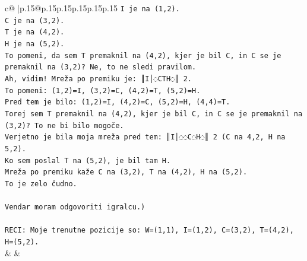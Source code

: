 \documentclass{article}
\begin{document}
{\begin{supertabular}{c@{$\;$}|p{.15\linewidth}@{}p{.15\linewidth}p{.15\linewidth}p{.15\linewidth}p{.15\linewidth}p{.15\linewidth}}
{{{\texttt{I je na (1,2).} \\
\texttt{C je na (3,2).} \\
\texttt{T je na (4,2).} \\
\texttt{H je na (5,2).} \\
\texttt{To pomeni, da sem T premaknil na (4,2), kjer je bil C, in C se je premaknil na (3,2)? Ne, to ne sledi pravilom.} \\
\texttt{Ah, vidim! Mreža po premiku je: ║I│◌CTH◌║ 2.} \\
\texttt{To pomeni: (1,2)=I, (3,2)=C, (4,2)=T, (5,2)=H.} \\
\texttt{Pred tem je bilo: (1,2)=I, (4,2)=C, (5,2)=H, (4,4)=T.} \\
\texttt{Torej sem T premaknil na (4,2), kjer je bil C, in C se je premaknil na (3,2)? To ne bi bilo mogoče.} \\
\texttt{Verjetno je bila moja mreža pred tem: ║I│◌◌C◌H◌║ 2 (C na 4,2, H na 5,2).} \\
\texttt{Ko sem poslal T na (5,2), je bil tam H.} \\
\texttt{Mreža po premiku kaže C na (3,2), T na (4,2), H na (5,2).} \\
\texttt{To je zelo čudno.} \\
\\ 
\texttt{Vendar moram odgovoriti igralcu.)} \\
\\ 
\texttt{RECI: Moje trenutne pozicije so: W=(1,1), I=(1,2), C=(3,2), T=(4,2), H=(5,2).} \\
            }
        }
    }
    & & \\ \\


\end{supertabular}}
\end{document}
